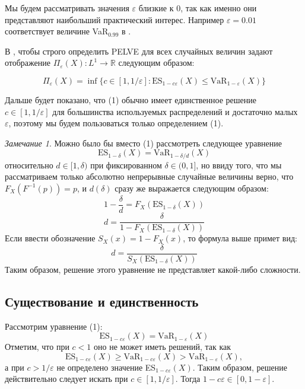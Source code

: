 \documentclass[12pt]{article}
\theoremstyle{plain}
\theoremstyle{definition}
\theoremstyle{remark}
\newtheorem{remark}{Замечание}[section]
\begin{document}
Мы будем рассматривать значения $\varepsilon$ близкие к 0, так как именно они представляют наибольший практический интерес. Например $\varepsilon = 0.01$ соответствует величине VaR$_{0.99}$ в \cite{BCBS2016}.

В \cite{метка0}, чтобы строго определить PELVE для всех случайных величин задают отображение $\Pi_\varepsilon(X):L^1 \to \mathbb{R}$ следующим образом:

\begin{equation*}
\Pi_\varepsilon(X) = \inf\{c \in [1, 1/\varepsilon]: \text{ES}_{1-c\varepsilon}(X) \leq \text{VaR}_{1-\varepsilon}(X)\}
\end{equation*}

Дальше будет показано, что (1) обычно имеет единственное решение $c \in [1, 1/\varepsilon]$ для большинства используемых распределений и достаточно малых $\varepsilon$, поэтому мы будем пользоваться только определением (1).

\begin{remark}
    Можно было бы вместо (1) рассмотреть следующее уравнение 
    \[
        \text{ES}_{1-\delta}(X) = \text{VaR}_{1-\delta/d}(X)
    \]
    относительно $d \in [1, \delta)$ при фиксированном $\delta \in (0, 1]$, но ввиду того, что мы рассматриваем только абсолютно непрерывные случайные величины верно, что $F_X(F^{-1}(p))=p$, и $d(\delta)$ сразу же выражается следующим образом:
    \[
        1-\frac{\delta}{d}= F_X(\text{ES}_{1-\delta}(X))
    \]
    \[
        d = \frac{\delta}{1-F_X(\text{ES}_{1-\delta}(X))}
    \]
    Если ввести обозначение $S_X(x)=1-F_X(x)$, то формула выше примет вид:
    \[
        d = \frac{\delta}{S_X(\text{ES}_{1-\delta}(X))}
    \]
    Таким образом, решение этого уравнение не представляет какой-либо сложности.
\end{remark}

\subsection{Существование и единственность}
Рассмотрим уравнение (1):
\[
    \text{ES}_{1-c\varepsilon}(X)=\text{VaR}_{1-\varepsilon}(X)
\]
Отметим, что при $c<1$ оно не может иметь решений, так как
\[
    \text{ES}_{1-c\varepsilon}(X) \geq \text{VaR}_{1-c\varepsilon}(X) > \text{VaR}_{1-\varepsilon}(X),
\]
а при $c > 1/\varepsilon$ не определено  значение ES$_{1-c\varepsilon}(X)$. Таким образом, решение действительно следует искать при $c \in [1, 1/\varepsilon]$. Тогда $1-c \varepsilon \in [0, 1-\varepsilon]$. 
\end{document}
